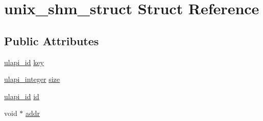 \hypertarget{structunix__shm__struct}{
\section{unix\_\-shm\_\-struct Struct Reference}
\label{structunix__shm__struct}
}
\subsection*{Public Attributes}
\begin{DoxyCompactItemize}
\item 
\hyperlink{ulapi_8hh_a382105adb3a098d4ff9dc973b2295555}{ulapi\_\-id} \hyperlink{structunix__shm__struct_aa1f214c8e4add2c4c7a3c31123193150}{key}
\item 
\hyperlink{ulapi_8hh_a110e6b8de916c218a17feafb79167f79}{ulapi\_\-integer} \hyperlink{structunix__shm__struct_a0e33a04868b3c80ee1897c521f27a7b4}{size}
\item 
\hyperlink{ulapi_8hh_a382105adb3a098d4ff9dc973b2295555}{ulapi\_\-id} \hyperlink{structunix__shm__struct_a9cb6e66b6831674cdbb5bf4b2de0354b}{id}
\item 
void $\ast$ \hyperlink{structunix__shm__struct_a9b980afdce9971ca6d97ea23e73beaf9}{addr}
\end{DoxyCompactItemize}



